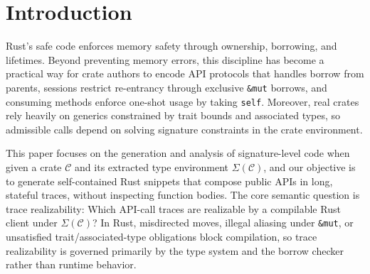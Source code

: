 \documentclass[runningheads]{llncs}
\begin{document}
\section{Introduction}
Rust’s safe code enforces memory safety through ownership, borrowing, and lifetimes. Beyond preventing memory errors, this discipline has become a practical way for crate authors to encode API protocols that handles borrow from parents, sessions restrict re-entrancy through exclusive \texttt{\&mut} borrows, and consuming methods enforce one-shot usage by taking \texttt{self}. Moreover, real crates rely heavily on generics constrained by trait bounds and associated types, so admissible calls depend on solving signature constraints in the crate environment.

This paper focuses on the generation and analysis of signature-level code when given a crate $\mathcal{C}$ and its extracted type environment $\Sigma(\mathcal{C})$, and our objective is to generate self-contained Rust snippets that compose public APIs in long, stateful traces, without inspecting function bodies.
The core semantic question is trace realizability: Which API-call traces are realizable by a compilable Rust client under $\Sigma(\mathcal{C})$? In Rust, misdirected moves, illegal aliasing under \texttt{\&mut}, or unsatisfied trait/associated-type obligations block compilation, so trace realizability is governed primarily by the type system and the borrow checker rather than runtime behavior.
\end{document}
